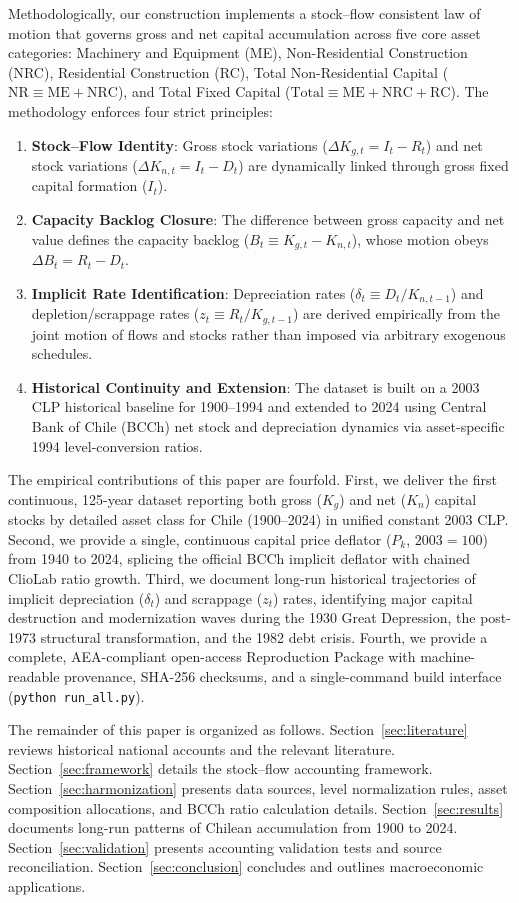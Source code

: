 Methodologically, our construction implements a stock--flow consistent law of motion that governs gross and net capital accumulation across five core asset categories: Machinery and Equipment (ME), Non-Residential Construction (NRC), Residential Construction (RC), Total Non-Residential Capital ($\text{NR} \equiv \text{ME} + \text{NRC}$), and Total Fixed Capital ($\text{Total} \equiv \text{ME} + \text{NRC} + \text{RC}$). The methodology enforces four strict principles:
\begin{enumerate}[label=(\roman*)]
    \item \textbf{Stock--Flow Identity}: Gross stock variations ($\Delta K_{g,t} = I_t - R_t$) and net stock variations ($\Delta K_{n,t} = I_t - D_t$) are dynamically linked through gross fixed capital formation ($I_t$).
    \item \textbf{Capacity Backlog Closure}: The difference between gross capacity and net value defines the capacity backlog ($B_t \equiv K_{g,t} - K_{n,t}$), whose motion obeys $\Delta B_t = R_t - D_t$.
    \item \textbf{Implicit Rate Identification}: Depreciation rates ($\delta_t \equiv D_t / K_{n,t-1}$) and depletion/scrappage rates ($z_t \equiv R_t / K_{g,t-1}$) are derived empirically from the joint motion of flows and stocks rather than imposed via arbitrary exogenous schedules.
    \item \textbf{Historical Continuity and Extension}: The dataset is built on a 2003 CLP historical baseline for 1900--1994 and extended to 2024 using Central Bank of Chile (BCCh) net stock and depreciation dynamics via asset-specific 1994 level-conversion ratios.
\end{enumerate}

The empirical contributions of this paper are fourfold. First, we deliver the first continuous, 125-year dataset reporting both gross ($K_g$) and net ($K_n$) capital stocks by detailed asset class for Chile (1900--2024) in unified constant 2003 CLP. Second, we provide a single, continuous capital price deflator ($P_k$, $2003=100$) from 1940 to 2024, splicing the official BCCh implicit deflator with chained ClioLab ratio growth. Third, we document long-run historical trajectories of implicit depreciation ($\delta_t$) and scrappage ($z_t$) rates, identifying major capital destruction and modernization waves during the 1930 Great Depression, the post-1973 structural transformation, and the 1982 debt crisis. Fourth, we provide a complete, AEA-compliant open-access Reproduction Package with machine-readable provenance, SHA-256 checksums, and a single-command build interface (\texttt{python run\_all.py}).

The remainder of this paper is organized as follows. Section~\ref{sec:literature} reviews historical national accounts and the relevant literature. Section~\ref{sec:framework} details the stock--flow accounting framework. Section~\ref{sec:harmonization} presents data sources, level normalization rules, asset composition allocations, and BCCh ratio calculation details. Section~\ref{sec:results} documents long-run patterns of Chilean accumulation from 1900 to 2024. Section~\ref{sec:validation} presents accounting validation tests and source reconciliation. Section~\ref{sec:conclusion} concludes and outlines macroeconomic applications.
